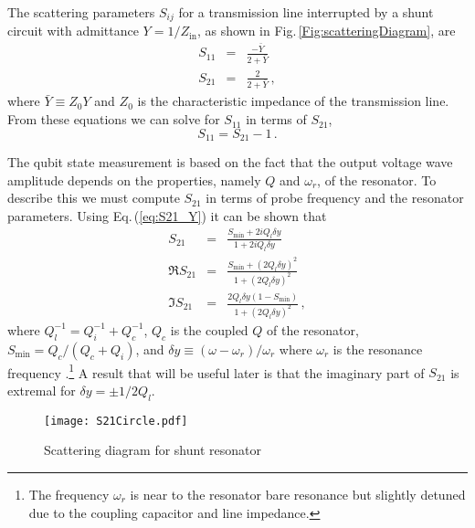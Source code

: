 The scattering parameters $S_{ij}$ for a transmission line interrupted by a shunt circuit with admittance $Y=1/Z_{\text{in}}$, as shown in Fig.\,\ref{Fig:scatteringDiagram}, are \cite{Pozar:microwaveEngineering2009} \begin{eqnarray}
S_{11} &=& \frac{-\bar{Y}}{2+\bar{Y}} \label{eq:S11_Y} \\
S_{21} &=& \frac{2}{2+\bar{Y}} \, , \label{eq:S21_Y} \end{eqnarray}
where $\bar{Y} \equiv Z_0 Y$ and $Z_0$ is the characteristic impedance of the transmission line.
From these equations we can solve for $S_{11}$ in terms of $S_{21}$, \begin{equation}
S_{11} = S_{21} - 1 \, . \label{eq:S11S21} \end{equation}

The qubit state measurement is based on the fact that the output voltage wave amplitude depends on the properties, namely $Q$ and $\omega_r$, of the resonator.
To describe this we must compute $S_{21}$ in terms of probe frequency and the resonator parameters.
Using Eq.\,(\ref{eq:S21_Y}) it can be shown that \begin{eqnarray}
S_{21} &=& \frac{S_{\textrm{min}} + 2iQ_l \delta y}{1+2iQ_l \delta y} \label{eq:S21} \\
\Re S_{21} &=& \frac{S_{\textrm{min}}+(2Q_l\delta y)^2}{1+(2Q_l\delta y)^2} \\
\Im S_{21} &=& \frac{2Q_l\delta y(1-S_{\textrm{min}})}{1+(2Q_l\delta y)^2} \, , \end{eqnarray}
where $Q_l^{-1} = Q_i^{-1} + Q_c^{-1}$, $Q_c$ is the coupled $Q$ of the resonator, $S_{\textrm{min}} = Q_c/(Q_c + Q_i)$, and $\delta y \equiv (\omega - \omega_r) / \omega_r$ where $\omega_r$ is the resonance frequency \cite{Mazin:thesis2004}.\footnote{The frequency $\omega_r$ is near to the resonator bare resonance but slightly detuned due to the coupling capacitor and line impedance.}
A result that will be useful later is that the imaginary part of $S_{21}$ is extremal for $\delta y = \pm 1/2Q_l$.

\begin{figure}
\begin{centering}
\texttt{[image: S21Circle.pdf]} 
\par\end{centering}
\caption{Scattering diagram for shunt resonator}
\label{Fig:S21Circle}
\end{figure}

